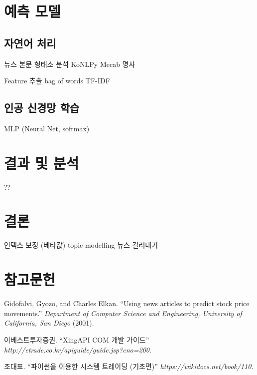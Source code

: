 \documentclass[a4paper,10pt]{article}
\begin{document}
\section{예측 모델}

\subsection{자연어 처리}

뉴스 본문
형태소 분석
KoNLPy
Mecab
명사

Feature 추출
bag of words
TF-IDF

\subsection{인공 신경망 학습}

MLP (Neural Net, softmax)

\section{결과 및 분석}

??

\section{결론}

인덱스 보정 (베타값)
topic modelling 뉴스 걸러내기

\section*{참고문헌}

\begin{enumerate}[ {[}1{]} ]
\item Gidofalvi, Gyozo, and Charles Elkan. ``Using news articles to predict stock price movements.'' \textit{Department of Computer Science and Engineering, University of California, San Diego} (2001).
\item 이베스트투자증권. ``XingAPI COM 개발 가이드'' \textit{http://etrade.co.kr/apiguide/guide.jsp?cno=200}.
\item 조대표. ``파이썬을 이용한 시스템 트레이딩 (기초편)'' \textit{https://wikidocs.net/book/110}.
\end{enumerate}
\end{document}
